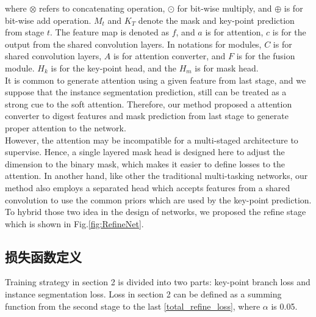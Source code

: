 where $\otimes$ refers to concatenating operation, $\odot$ for bit-wise multiply, and $\oplus$ is for bit-wise add operation. $M_t$ and $K_T$ denote the mask and key-point prediction from stage $t$. The feature map is denoted as $f$, and $a$ is for attention, $c$ is for the output from the shared convolution layers. In notations for modules, $C$ is for shared convolution layers, $A$ is for attention converter, and $F$ is for the fusion module. $H_k$ is for the key-point head, and the $H_m$ is for mask head.\\
It is common to generate attention using a given feature from last stage, and we suppose that the instance segmentation prediction, still can be treated as a strong cue to the soft attention. Therefore, our method proposed a attention converter to digest features and mask prediction from last stage to generate proper attention to the network.\\
However, the attention may be incompatible for a multi-staged architecture to supervise. Hence, a single layered mask head is designed here to adjust the dimension to the binary mask, which makes it easier to define losses to the attention. In another hand, like other the traditional multi-tasking networks, our method also employs a separated head which accepts features from a shared convolution to use the common priors which are used by the key-point prediction. To hybrid those two idea in the design of networks, we proposed the refine stage which is shown in Fig.\ref{fig:RefineNet}.\\

\subsection{损失函数定义}
\label{subsec:lossfunctions}
Training strategy in section 2 is divided into two parts: key-point branch loss and instance segmentation loss. Loss in section 2 can be defined as a summing function from the second stage to the last \eqref{total_refine_loss}, where $\alpha$ is 0.05.

